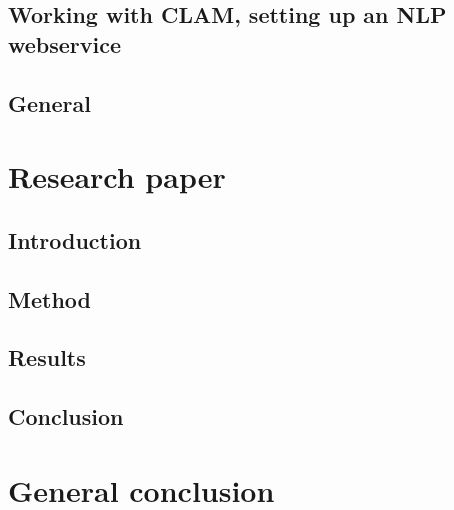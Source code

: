 \documentclass[12pt]{article}
\begin{document}
\subsection{Working with CLAM, setting up an NLP webservice}

\subsection{General}


\section{Research paper}

\subsection{Introduction}

\subsection{Method}

\subsection{Results}

\subsection{Conclusion}

\section{General conclusion}
\end{document}
